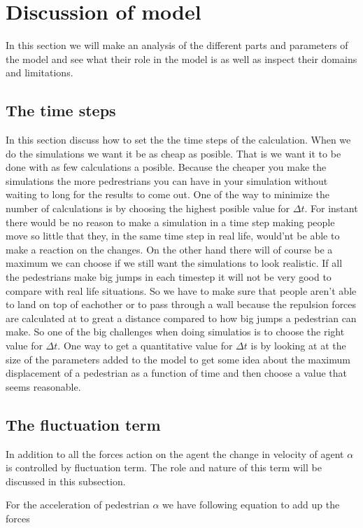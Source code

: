 \documentclass[danish,a4paper]{article}
\begin{document}
\section{Discussion of model}
In this section we will make an analysis of the different parts and 
parameters of the model and see what their role in the model is as well 
as inspect their domains and limitations. 

\subsection{The time steps}
In this section discuss how to set the the time steps of the calculation. 
When we do the simulations we want it be as cheap as posible. That is we want it to be done with as few calculations a posible. Because the cheaper you make the simulations the more pedrestrians you can have in your simulation without waiting to long for the results to come out. One of the way to minimize the number of calculations is by choosing the highest posible value for $\Delta t$. For instant there would be no reason to make a simulation in a time step making people move so little that they, in the same time step in real life, would'nt be able to make a reaction on the changes.  
On the other hand there will of course be a maximum we can choose if we still want the simulations to look realistic. If all the pedestrians make big jumps in each timestep it will not be very good to compare with real life situations. So we have to make sure that people aren't able to land on top of eachother or to pass through a wall because the repulsion forces are calculated at to great a distance compared to how big jumps a pedestrian can make.
So one of the big challenges when doing simulatios is to choose the right value for $\Delta t$. One way to get a quantitative value for $\Delta t$ is by looking at at the size of the parameters added to the model to get some idea about the maximum displacement of a pedestrian as a function of time and then choose a value that seems reasonable.


\subsection{The fluctuation term}
In addition to all the forces action on the agent the change in velocity of agent 
$\alpha$ is controlled by fluctuation term. The role and nature of this term will 
be discussed in this subsection.

For the acceleration of pedestrian $\alpha$ we have following equation to add up the forces
\end{document}
